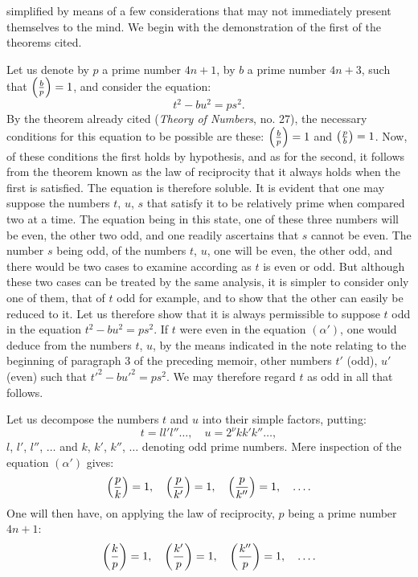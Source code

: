 \noindent
simplified by means of a few considerations that may not immediately
present themselves to the mind. We begin with the demonstration of the first
of the theorems cited.
\par\indent
Let us denote by $p$ a prime number $4n+1$, by $b$ a prime number
$4n+3$, such that $\left(\frac{b}{p}\right)=1$, and consider the equation:
\begin{equation*}\tag{$\alpha'$}
t^2-bu^2=ps^2.
\end{equation*}
By the theorem already cited (\emph{Theory of Numbers}, no. 27), the necessary
conditions for this equation to be possible are these: $\left(\frac{b}{p}\right)=1$ and
$\left(\frac{p}{b}\right)=1$. Now, of these conditions the first holds by hypothesis, and as
for the second, it follows from the theorem known as the law of reciprocity
that it always holds when the first is satisfied. The equation is therefore
soluble. It is evident that one may suppose the numbers $t$, $u$, $s$ that
satisfy it to be relatively prime when compared two at a time. The equation being
in this state, one of these three numbers will be even, the other two odd, and
one readily ascertains that $s$ cannot be even. The number $s$ being odd,
of the numbers $t$, $u$, one will be even, the other odd, and there would be two cases to
examine according as $t$ is even or odd. But although these two cases can
be treated by the same analysis, it is simpler to consider only
one of them, that of $t$ odd for example, and to show that the other
can easily be reduced to it. Let us therefore show that it is always permissible to
suppose $t$ odd in the equation $t^2-bu^2=ps^2$. If $t$ were even in
the equation $(\alpha')$, one would deduce from the numbers $t$, $u$, by the means indicated in the note
relating to the beginning of paragraph 3 of the preceding memoir, other
numbers $t'$ (odd), $u'$ (even) such that $t'^2-bu'^2=ps^2$. We may therefore
regard $t$ as odd in all that follows.
\par\indent
Let us decompose the numbers $t$ and $u$ into their simple factors, putting:
\[
t=ll'l''\ldots,\quad u=2^\nu kk'k''\ldots,
\]
$l$, $l'$, $l''$, $\ldots$ and $k$, $k'$, $k''$, $\ldots$ denoting odd prime numbers. Mere
inspection of the equation $(\alpha')$ gives:
\[
\left(\frac{p}{k}\right)=1,\quad\left(\frac{p}{k'}\right)=1,\quad\left(\frac{p}{k''}\right)=1,\quad\ldots.
\]
One will then have, on applying the law of reciprocity, $p$ being a prime
number $4n+1$:
\[
\left(\frac{k}{p}\right)=1,\quad\left(\frac{k'}{p}\right)=1,\quad\left(\frac{k''}{p}\right)=1,\quad\ldots.
\]
